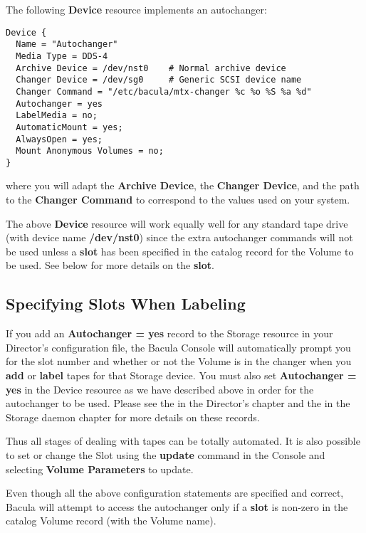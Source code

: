 The following {\bf Device} resource implements an autochanger: 

\footnotesize
\begin{verbatim}
Device {
  Name = "Autochanger"
  Media Type = DDS-4
  Archive Device = /dev/nst0    # Normal archive device
  Changer Device = /dev/sg0     # Generic SCSI device name
  Changer Command = "/etc/bacula/mtx-changer %c %o %S %a %d"
  Autochanger = yes
  LabelMedia = no;
  AutomaticMount = yes;
  AlwaysOpen = yes;
  Mount Anonymous Volumes = no;
}
\end{verbatim}
\normalsize

where you will adapt the {\bf Archive Device}, the {\bf Changer Device}, and
the path to the {\bf Changer Command} to correspond to the values used on your
system. 

The above {\bf Device} resource will work equally well for any standard tape
drive (with device name {\bf /dev/nst0}) since the extra autochanger commands
will not be used unless a {\bf slot} has been specified in the catalog record
for the Volume to be used. See below for more details on the {\bf slot}. 
\label{SpecifyingSlots}

\subsection*{Specifying Slots When Labeling}

If you add an {\bf Autochanger = yes} record to the Storage resource in your
Director's configuration file, the Bacula Console will automatically prompt
you for the slot number and whether or not the Volume is in the changer when
you {\bf add} or {\bf label} tapes for that Storage device. You must also set
{\bf Autochanger = yes} in the Device resource as we have described above in
order for the autochanger to be used. Please see the 
 in the Director's chapter
and the 
 in the Storage daemon
chapter for more details on these records. 

Thus all stages of dealing with tapes can be totally automated. It is also
possible to set or change the Slot using the {\bf update} command in the
Console and selecting {\bf Volume Parameters} to update. 

Even though all the above configuration statements are specified and correct,
Bacula will attempt to access the autochanger only if a {\bf slot} is non-zero
in the catalog Volume record (with the Volume name). 

